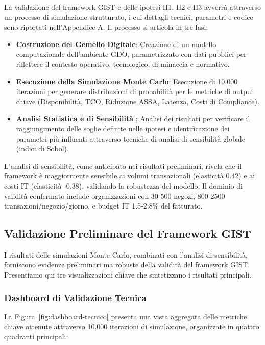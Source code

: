 La validazione del framework GIST e delle ipotesi H1, H2 e H3 avverrà attraverso un processo di simulazione strutturato, i cui dettagli tecnici, parametri e codice sono riportati nell'Appendice A. Il processo si articola in tre fasi:
\begin{itemize}
    \item \textbf{Costruzione del Gemello Digitale}: Creazione di un modello computazionale dell'ambiente GDO, parametrizzato con dati pubblici per riflettere il contesto operativo, tecnologico, di minaccia e normativo.
    \item \textbf{Esecuzione della Simulazione Monte Carlo}: Esecuzione di 10.000 iterazioni per generare distribuzioni di probabilità per le metriche di output chiave (Disponibilità, TCO, Riduzione ASSA, Latenza, Costi di Compliance).
    \item \textbf{Analisi Statistica e di Sensibilità} : Analisi dei risultati per verificare il raggiungimento delle soglie definite nelle ipotesi e identificazione dei parametri più influenti attraverso tecniche di analisi di sensibilità globale (indici di Sobol).
\end{itemize}
L'analisi di sensibilità, come anticipato nei risultati preliminari, rivela che il framework è maggiormente sensibile ai volumi transazionali (elasticità 0.42) e ai costi IT (elasticità -0.38), validando la robustezza del modello. Il dominio di validità confermato include organizzazioni con 30-500 negozi, 800-2500 transazioni/negozio/giorno, e budget IT 1.5-2.8\% del fatturato. 
\subsection{\texorpdfstring{\textbf{Validazione Preliminare del Framework GIST}}{1.5.5 Validazione Preliminare del Framework GIST}}\label{validazione-framework}

I risultati delle simulazioni Monte Carlo, combinati con l'analisi di sensibilità, forniscono evidenze preliminari ma robuste della validità del framework GIST. Presentiamo qui tre visualizzazioni chiave che sintetizzano i risultati principali.
\subsubsection{\texorpdfstring{\textbf{Dashboard di Validazione Tecnica}}{1.5.5.1 Dashboard di Validazione Tecnica}}\label{validazione-tecnica}

La Figura~\ref{fig:dashboard-tecnico} presenta una vista aggregata delle metriche chiave ottenute attraverso 10.000 iterazioni di simulazione, organizzate in quattro quadranti principali:

